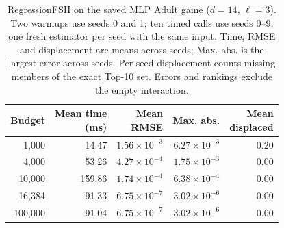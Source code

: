 \begin{table}[t]
\centering
\caption{RegressionFSII on the saved MLP Adult game ($d=14$, $\ell=3$). Two warmups use seeds 0 and 1; ten timed calls use seeds 0--9, one fresh estimator per seed with the same input. Time, RMSE and displacement are means across seeds; Max. abs. is the largest error across seeds. Per-seed displacement counts missing members of the exact Top-10 set. Errors and rankings exclude the empty interaction.}
\label{tab:regression_fsii}
\begingroup
\footnotesize
\setlength{\tabcolsep}{3pt}
\begin{tabular}{@{}rrrrr@{}}
\toprule
Budget & \shortstack[r]{Mean time\\(ms)} & \shortstack[r]{Mean\\RMSE} & Max. abs. & \shortstack[r]{Mean\\displaced} \\
\midrule
1,000 & 14.47 & $1.56\!\times\!10^{-3}$ & $6.27\!\times\!10^{-3}$ & 0.20 \\
4,000 & 53.26 & $4.27\!\times\!10^{-4}$ & $1.75\!\times\!10^{-3}$ & 0.00 \\
10,000 & 159.86 & $1.74\!\times\!10^{-4}$ & $6.38\!\times\!10^{-4}$ & 0.00 \\
16,384 & 91.33 & $6.75\!\times\!10^{-7}$ & $3.02\!\times\!10^{-6}$ & 0.00 \\
100,000 & 91.04 & $6.75\!\times\!10^{-7}$ & $3.02\!\times\!10^{-6}$ & 0.00 \\
\bottomrule
\end{tabular}
\endgroup
\end{table}
